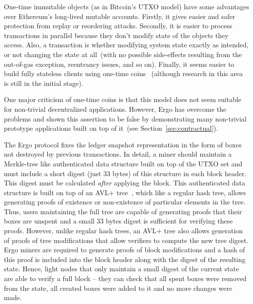 
One-time immutable objects (as in Bitcoin's UTXO model) have some advantages over Ethereum's long-lived mutable accounts.
Firstly, it gives easier and safer protection from replay or reordering attacks.
Secondly, it is easier to process transactions in parallel because they don't modify state of the objects they access.
Also, a transaction is whether modifying system state exactly as intended, or not changing the state at all~(with no
possible side-effects resulting from the out-of-gas exception, reentrancy issues, and so on).
Finally, it seems easier to build fully stateless clients using one-time coins~\cite{chepurnoy2018edrax} (although research in this area is still in the initial stage).

One major criticism of one-time coins is that this model does not seem suitable for non-trivial decentralized applications. However, Ergo has overcome the problems and shown this assertion to be false by
demonstrating many non-trivial prototype applications built on top of
it~(see Section~\ref{sec:contractual}).

The Ergo protocol fixes the ledger snapshot representation in the form of boxes not destroyed by previous transactions.
In detail, a miner should maintain a Merkle-tree like authenticated data structure built on top of the UTXO set and must include a short digest (just 33 bytes) of this structure in each block header. This digest must be calculated {\em after} applying the block.
This authenticated data structure is built on top of an AVL+ tree~\cite{reyzin2017improving}, which like a regular hash tree,
allows generating proofs of existence or non-existence of particular elements in the tree.
Thus, users maintaining the full tree are capable of generating proofs that their boxes are unspent and a small 33 bytes digest is sufficient for verifying these proofs.
However, unlike regular hash trees, an AVL+ tree also allows generation of proofs of tree modifications that allow verifiers to compute the new tree digest.
Ergo miners are required to generate proofs of block modifications and a hash of this proof is included into the block header along with the digest of the resulting state.
Hence, light nodes that only maintain a small digest of the current state are able to verify a full block -- they can check that all spent boxes were
removed from the state, all created boxes were added to it and no more changes were made.

